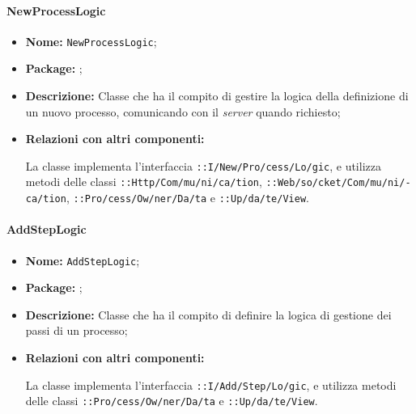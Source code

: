 \paragraph{NewProcessLogic}
\begin{flushleft}
\begin{itemize}
\item \textbf{Nome:} \texttt{NewProcessLogic};
\item \textbf{Package:} \texttt{\logicAdmin{}};
\item \textbf{Descrizione:} Classe che ha il compito di gestire la logica della definizione di un nuovo processo, comunicando con il \textit{server} quando richiesto;
\item \textbf{Relazioni con altri componenti:}
\begin{sloppypar}
La classe implementa l'interfaccia \texttt{\iLogicAdmin{}::I\fshyp{}New\fshyp{}Pro\fshyp{}cess\fshyp{}Lo\fshyp{}gic}, e utilizza metodi delle classi \texttt{\serverCommunication{}::Http\fshyp{}Com\fshyp{}mu\fshyp{}ni\fshyp{}ca\fshyp{}tion}, \texttt{\serverCommunication{}::Web\fshyp{}so\fshyp{}cket\fshyp{}Com\fshyp{}mu\fshyp{}ni\fshyp{}ca\fshyp{}tion}, \texttt{\modelAdmin{}::Pro\fshyp{}cess\fshyp{}Ow\fshyp{}ner\fshyp{}Da\fshyp{}ta} e \texttt{\logicAdmin{}::Up\fshyp{}da\fshyp{}te\fshyp{}View}.
\end{sloppypar}
\end{itemize}
\end{flushleft}

\paragraph{AddStepLogic}
\begin{flushleft}
\begin{itemize}
\item \textbf{Nome:} \texttt{AddStepLogic};
\item \textbf{Package:} \texttt{\logicAdmin{}};
\item \textbf{Descrizione:} Classe che ha il compito di definire la logica di gestione dei passi di un processo;
\item \textbf{Relazioni con altri componenti:}
\begin{sloppypar}
La classe implementa l'interfaccia \texttt{\iLogicAdmin{}::I\fshyp{}Add\fshyp{}Step\fshyp{}Lo\fshyp{}gic}, e utilizza metodi delle classi \texttt{\model{}::Pro\fshyp{}cess\fshyp{}Ow\fshyp{}ner\fshyp{}Da\fshyp{}ta} e \texttt{\logicAdmin{}::Up\fshyp{}da\fshyp{}te\fshyp{}View}.
\end{sloppypar}
\end{itemize}
\end{flushleft}

